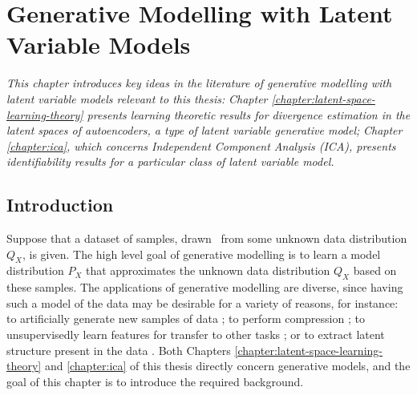 
\chapter{Generative Modelling with Latent Variable Models}

\ifpdf
    \graphicspath{{Chapter2/Figs/Raster/}{Chapter2/Figs/PDF/}{Chapter2/Figs/}}
\else
    \graphicspath{{Chapter2/Figs/Vector/}{Chapter2/Figs/}}
\fi

\emph{This chapter introduces key ideas in the literature of generative modelling with latent variable models relevant to this thesis:}
\emph{Chapter \ref{chapter:latent-space-learning-theory} presents learning theoretic results for divergence estimation in the latent spaces of autoencoders, a type of latent variable generative model;}
\emph{Chapter \ref{chapter:ica}, which concerns Independent Component Analysis (ICA), presents identifiability results for a particular class of latent variable model.}


\section{Introduction}\label{sec:generative-modelling-tour}

Suppose that a dataset of samples, drawn \iid~from some unknown data distribution $Q_X$, is given.
The high level goal of generative modelling is to learn a model distribution $P_X$ that approximates the unknown data distribution $Q_X$ based on these samples.
The applications of generative modelling are diverse, since
having such a model of the data may be desirable for a variety of reasons, for instance: to artificially generate new samples of data \citep{goodfellow2014generative, oord2016wavenet}; to perform compression \citep{townsend2019practical, townsend2019hilloc}; to unsupervisedly learn features for transfer to other tasks \citep{tschannen2018recent, donahue2019large}; or to extract latent structure present in the data \citep{hyvarinen2000independent}.
Both Chapters \ref{chapter:latent-space-learning-theory} and \ref{chapter:ica} of this thesis directly concern generative models, and the goal of this chapter is to introduce the required background.





